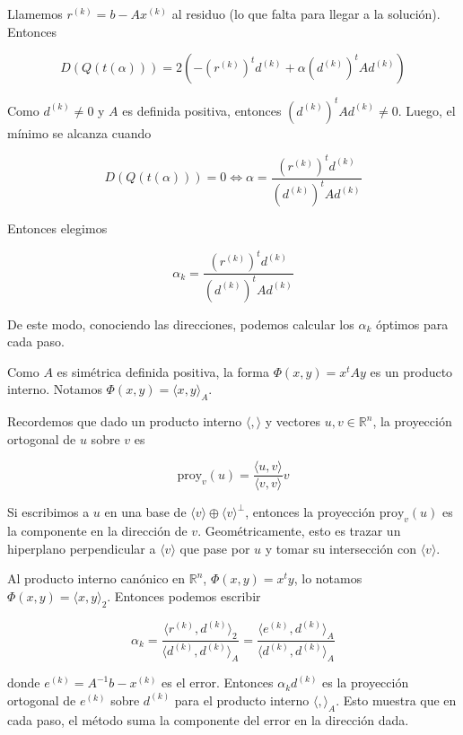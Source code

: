 Llamemos $r^{(k)} = b - Ax^{(k)}$ al residuo (lo que falta para llegar a la solución). Entonces

\[D(Q(t(\alpha))) = 2(-(r^{(k)})^t d^{(k)} + \alpha (d^{(k)})^t A d^{(k)})\]


Como $d^{(k)} \neq 0$ y $A$ es definida positiva, entonces $(d^{(k)})^t A d^{(k)} \neq 0$. Luego, el mínimo se alcanza cuando

\[D(Q(t(\alpha))) = 0 \Leftrightarrow \alpha = \frac{(r^{(k)})^t d^{(k)}}{(d^{(k)})^t A d^{(k)}}\]

Entonces elegimos

\[\alpha_k = \frac{(r^{(k)})^t d^{(k)}}{(d^{(k)})^t A d^{(k)}}\]

De este modo, conociendo las direcciones, podemos calcular los $\alpha_k$ óptimos para cada paso.

\begin{obs}
Como $A$ es simétrica definida positiva, la forma $\Phi(x, y) = x^tAy$ es un producto interno. Notamos $\Phi(x, y) = \langle x, y \rangle_A$.
\end{obs}

\begin{obs}
Recordemos que dado un producto interno $\langle , \rangle$ y vectores $u, v \in \mathbb{R}^n$, la proyección ortogonal de $u$ sobre $v$ es

\[\text{proy}_{v}(u) = \frac{\langle u, v\rangle}{\langle v, v \rangle} v\]

Si escribimos a $u$ en una base de $\langle v \rangle \oplus \langle v \rangle^{\perp}$, entonces la proyección $\text{proy}_{v}(u)$ es la componente en la dirección de $v$. Geométricamente, esto es trazar un hiperplano perpendicular a $\langle v \rangle$ que pase por $u$ y tomar su intersección con $\langle v \rangle$. 
\end{obs}

Al producto interno canónico en $\mathbb{R}^n$, $\Phi(x, y) = x^ty$, lo notamos $\Phi(x, y) = \langle x, y \rangle_2$. Entonces podemos escribir

\[\alpha_k = \frac{\langle r^{(k)}, d^{(k)} \rangle_2}{\langle d^{(k)}, d^{(k)} \rangle_A} = 
\frac{\langle e^{(k)}, d^{(k)} \rangle_A}{\langle d^{(k)}, d^{(k)} \rangle_A}\]

donde $e^{(k)} = A^{-1}b - x^{(k)}$ es el error. Entonces $\alpha_k d^{(k)}$ es la proyección ortogonal de $e^{(k)}$ sobre $d^{(k)}$ para el producto interno $\langle , \rangle_A$. Esto muestra que en cada paso, el método suma la componente del error en la dirección dada.

